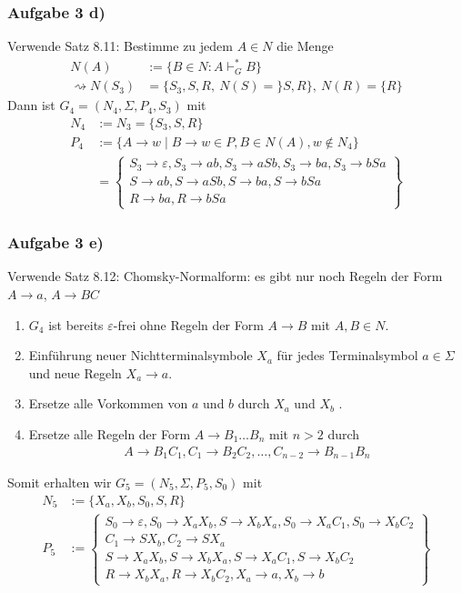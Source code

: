 \subsubsection{Aufgabe 3 d)}

\begin{lösung}
	Verwende Satz 8.11:
	Bestimme zu jedem $A\in N$ die Menge 
	\begin{align*}
		N(A)&:=\big\lbrace B\in N:A\vdash_G^\ast B\big\rbrace\\
		\rightsquigarrow N(S_3)&=\lbrace S_3,S,R,~N(S)=\rbrace S,R\rbrace,~N(R)=\lbrace R\rbrace
	\end{align*}
	Dann ist $G_4=(N_4,\Sigma,P_4,S_3)$ mit
	\begin{align*}
		N_4&:=N_3=\lbrace S_3,S,R\rbrace\\
		P_4&:=\big\lbrace A\to w\mid B\to w\in P,B\in N(A),w\not\in N_4\big\rbrace\\
		&=\left\lbrace\begin{array}{l}
				S_3\to\varepsilon, S_3\to ab,S_3\to aSb,S_3\to ba,S_3\to bSa\\
			S\to ab, S\to aSb,S\to ba, S\to bSa\\
			R\to ba, R\to bSa
		\end{array}\right\rbrace
	\end{align*}
\end{lösung}

\subsubsection{Aufgabe 3 e)}
\begin{lösung}
	Verwende Satz 8.12:
	Chomsky-Normalform: es gibt nur noch Regeln der Form $A\to a$, $A\to BC$
	\begin{enumerate}
		\item $G_4$ ist bereits $\varepsilon$-frei ohne Regeln der Form $A\to B$ mit $A,B\in N$.
		\item Einführung neuer Nichtterminalsymbole $X_a$ für jedes Terminalsymbol $a\in\Sigma$ und neue Regeln $X_a\to a$.
		\item Ersetze alle Vorkommen von $a$ und $b$ durch $X_a$  und $X_b$ .
		\item Ersetze alle Regeln der Form $A\to B_1\ldots B_n$ mit $n>2$ durch 
		\begin{align*}
			A\to B_1C_1,C_1\to B_2C_2,\ldots,C_{n-2}\to B_{n-1}B_n
		\end{align*}
	\end{enumerate}
	Somit erhalten wir $G_5=(N_5,\Sigma,P_5,S_0)$ mit
	\begin{align*}
		N_5&:=\big\lbrace X_a,X_b,S_0,S,R\big\rbrace\\
		P_5&:=\left\lbrace\begin{array}{l}
			S_0\to\varepsilon, S_0\to X_a X_b, S\to X_b X_a, S_0\to X_a C_1,S_0\to X_b C_2\\
			C_1\to SX_b,C_2\to SX_a\\
			S\to X_aX_b,S\to X_bX_a,S\to X_aC_1, S\to X_b C_2\\
			R\to X_bX_a, R\to X_bC_2,X_a\to a,X_b\to b
		\end{array}\right\rbrace
	\end{align*}
\end{lösung}